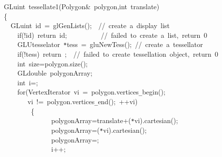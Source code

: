 {
\noindent \ttfamily
\jttstylek GLuint~tessellate1\jttstylei (\jttstylek Polygon\&~polygon,int~translate\jttstylei )\\
\jttstylei \{\\
\jttstylea ~~\jttstylek GLuint~id~=~glGenLists\jttstylei (\jttstylei )\jttstylek ;~~\jttstyled //~create~a~display~list\\
\jttstylea ~~~~\jttstylee if\jttstylei (\jttstylek !id\jttstylei )~\jttstylee return~\jttstylek id;~~~~~~~~~~\jttstyled //~failed~to~create~a~list,~return~0\\
\jttstylea ~~~~\jttstylek GLUtesselator~\verb#*#tess~=~gluNewTess\jttstylei ()\jttstylek ;~\jttstyled //~create~a~tessellator\\
\jttstylea ~~~~\jttstylee if\jttstylei (\jttstylek !tess\jttstylei )~\jttstylee return~\jttstylek ;~~\jttstyled //~failed~to~create~tessellation~object,~return~0\\
\jttstylea ~~~~\jttstylej int~\jttstylek size=polygon.size\jttstylei ()\jttstylek ;\\
\jttstylea ~~~~\jttstylek GLdouble~polygonArray\jttstylek ;\\
\jttstylea ~~~~\jttstylej int~\jttstylek i=\jttstylek ;\\
\jttstylea ~~~~\jttstylee for\jttstylei (\jttstylek VertexIterator~vi~=~polygon.vertices\verb#_#begin\jttstylei ()\jttstylek ;\\
\jttstylea ~~~~~~\jttstylek ~vi~!=~polygon.vertices\verb#_#end\jttstylei ()\jttstylek ;~++vi\jttstylei ) \\
\jttstylea ~~~~~~~~\jttstylei \{\\
\jttstylea ~~~~~~~~~~~~~~\jttstylek polygonArray\jttstylek =translate+\jttstylei (\jttstylek \verb#*#vi\jttstylei )\jttstylek .cartesian\jttstylei (\jttstylei )\jttstylek ;\\
\jttstylea ~~~~~~~~~~~~~~\jttstylek polygonArray\jttstylek =\jttstylei (\jttstylek \verb#*#vi\jttstylei )\jttstylek .cartesian\jttstylei (\jttstylei )\jttstylek ;\\
\jttstylea ~~~~~~~~~~~~~~\jttstylek polygonArray\jttstylek =\jttstylek ;\\
\jttstylea ~~~~~~~~~~~~~~\jttstylek i++;\\
}
